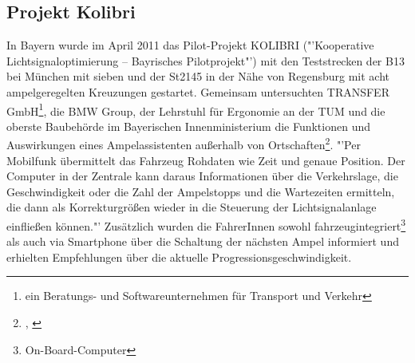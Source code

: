 \subsection{Projekt Kolibri}
In Bayern wurde im April 2011 das Pilot-Projekt \textsc{KOLIBRI} ("'Kooperative Lichtsignaloptimierung -- Bayrisches Pilotprojekt"') mit den Teststrecken der B13 bei München mit sieben und der St2145 in der Nähe von Regensburg mit acht ampelgeregelten Kreuzungen gestartet. Gemeinsam untersuchten TRANSFER GmbH\footnote{ ein Beratungs- und Softwareunternehmen für Transport und Verkehr}, die \gls{BMW} Group, der Lehrstuhl für Ergonomie an der \gls{TUM} und die oberste Baubehörde im Bayerischen Innenministerium die Funktionen und Auswirkungen eines Ampelassistenten außerhalb von Ortschaften\footnote{\cite{kolibri}, \cite{kolibriTUM}}. "'Per Mobilfunk übermittelt das Fahrzeug Rohdaten wie Zeit und genaue Position. Der Computer in der Zentrale kann daraus Informationen über die Verkehrslage, die Geschwindigkeit oder die Zahl der Ampelstopps und die Wartezeiten ermitteln, die dann als Korrekturgrößen wieder in die Steuerung der Lichtsignalanlage einfließen können."' \cite{kolibriTUM} Zusätzlich wurden die FahrerInnen sowohl fahrzeugintegriert\footnote{ On-Board-Computer} als auch via Smartphone über die Schaltung der nächsten Ampel informiert und erhielten Empfehlungen über die aktuelle Progressionsgeschwindigkeit. 
